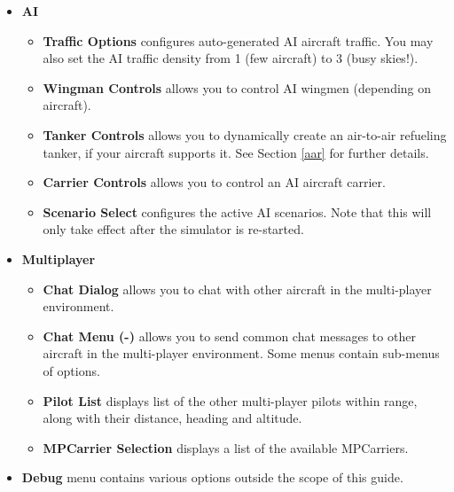 \begin{itemize}
\item \textbf{AI}
 \begin{itemize}
  \item \textbf{Traffic Options} configures auto-generated AI aircraft traffic.
  You may also set the AI traffic density from 1 (few aircraft) to 3 (busy skies!).
  \item \textbf{Wingman Controls} allows you to control AI wingmen (depending on aircraft).
  \item \textbf{Tanker Controls}  allows you to dynamically create an air-to-air refueling
  tanker, if your aircraft supports it. See Section \ref{aar} for further details.
  \item \textbf{Carrier Controls} allows you to control an AI aircraft carrier.
  \item \textbf{Scenario Select}  configures the active AI scenarios.
  Note that this will only take effect after the simulator is re-started.
 \end{itemize}

\item \textbf{Multiplayer}
 \begin{itemize}
  \item \textbf{Chat Dialog} allows you to chat with other aircraft in
the multi-player environment.
  \item \textbf{Chat Menu (-)} allows you to send common chat messages to
  other aircraft in the multi-player environment. Some menus
  contain sub-menus of options.
  \item \textbf{Pilot List} displays list of the other multi-player pilots
  within range, along with their distance, heading and altitude.
  \item \textbf{MPCarrier Selection} displays a list of the available MPCarriers.
\end{itemize}

\item \textbf{Debug} menu contains various options
outside the scope of this guide.


\end{itemize}
